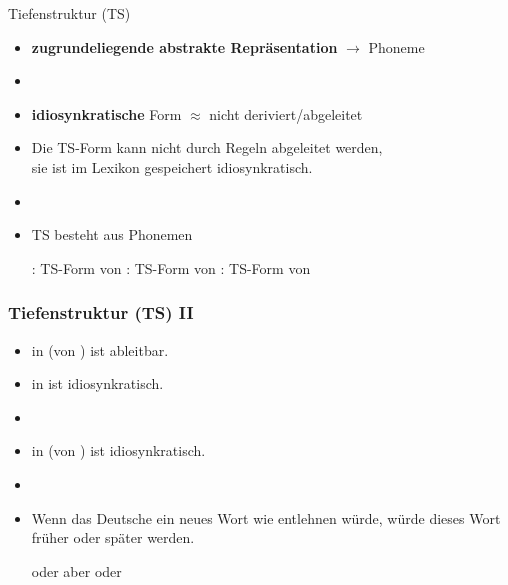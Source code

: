 
\begin{frame}{Tiefenstruktur (TS)}
	
\begin{itemize}
	\item \textbf{zugrundeliegende abstrakte Repräsentation} $\rightarrow$ Phoneme \textipa{/ /}
	\item[]
	\item \textbf{idiosynkratische} Form $\approx$ nicht deriviert/abgeleitet
	\item Die TS-Form kann nicht durch Regeln abgeleitet werden,\\
                sie ist im Lexikon gespeichert \dash idiosynkratisch.
	\item[]
	\item TS besteht aus Phonemen
	
	\eal
		\ex {}: TS-Form von 
		\ex {}: TS-Form von 
		\ex {}: TS-Form von 
	\zl
	
\end{itemize}
		
\end{frame}


\begin{frame}
\frametitle{Tiefenstruktur (TS) II}

\begin{itemize}
	\item \textipa{[t]} in  (von ) ist ableitbar.
	\item {} in  ist idiosynkratisch.
	\item[]
	\item {} in  (von ) ist idiosynkratisch.
	\item[]
	\item Wenn das Deutsche ein neues Wort wie  \textipa{[k@Ud]} entlehnen würde, würde dieses Wort früher oder später  werden.
	
	\ea \textipa{[kOUt]} oder \textipa{[ko:t]} aber  oder  
	\z
	
\end{itemize}

\end{frame}


